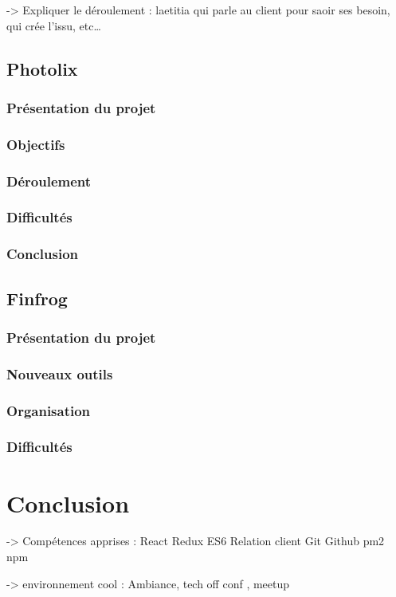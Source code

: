 -\textgreater{} Expliquer le déroulement : laetitia qui parle au client
pour saoir ses besoin, qui crée l'issu, etc\ldots{}

\subsection{Photolix}\label{photolix}

\subsubsection{Présentation du projet}\label{pruxe9sentation-du-projet}

\subsubsection{Objectifs}\label{objectifs}

\subsubsection{Déroulement}\label{duxe9roulement}

\subsubsection{Difficultés}\label{difficultuxe9s}

\subsubsection{Conclusion}\label{conclusion}

\subsection{Finfrog}\label{finfrog}

\subsubsection{Présentation du
projet}\label{pruxe9sentation-du-projet-1}

\subsubsection{Nouveaux outils}\label{nouveaux-outils}

\subsubsection{Organisation}\label{organisation-1}

\subsubsection{Difficultés}\label{difficultuxe9s-1}

\section{Conclusion}\label{conclusion-1}

-\textgreater{} Compétences apprises : React Redux ES6 Relation client
Git Github pm2 npm

-\textgreater{} environnement cool : Ambiance, tech off conf , meetup
